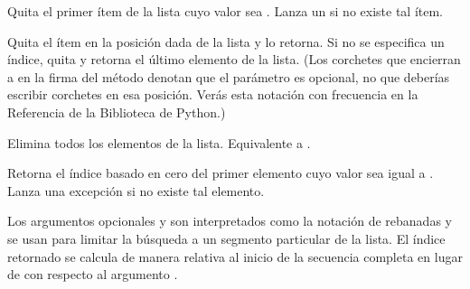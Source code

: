 \documentclass[a5paper,10pt,spanish]{sphinxmanual}
\begin{document}
\begin{fulllineitems}
\sphinxAtStartPar
Quita el primer ítem de la lista cuyo valor sea . Lanza un  si no existe tal ítem.

\end{fulllineitems}



\begin{fulllineitems}
\sphinxAtStartPar
Quita el ítem en la posición dada de la lista y lo retorna. Si no se especifica un índice,  quita y retorna el último elemento de la lista. (Los corchetes que encierran a  en la firma del método denotan que el parámetro es opcional, no que deberías escribir corchetes en esa posición. Verás esta notación con frecuencia en la Referencia de la Biblioteca de Python.)

\end{fulllineitems}



\begin{fulllineitems}
\sphinxAtStartPar
Elimina todos los elementos de la lista. Equivalente a .

\end{fulllineitems}



\begin{fulllineitems}
\sphinxAtStartPar
Retorna el índice basado en cero del primer elemento cuyo valor sea igual a . Lanza una excepción  si no existe tal elemento.

\sphinxAtStartPar
Los argumentos opcionales  y  son interpretados como la notación de rebanadas y se usan para limitar la búsqueda a un segmento particular de la lista. El índice retornado se calcula de manera relativa al inicio de la secuencia completa en lugar de con respecto al argumento .

\end{fulllineitems}
\end{document}
